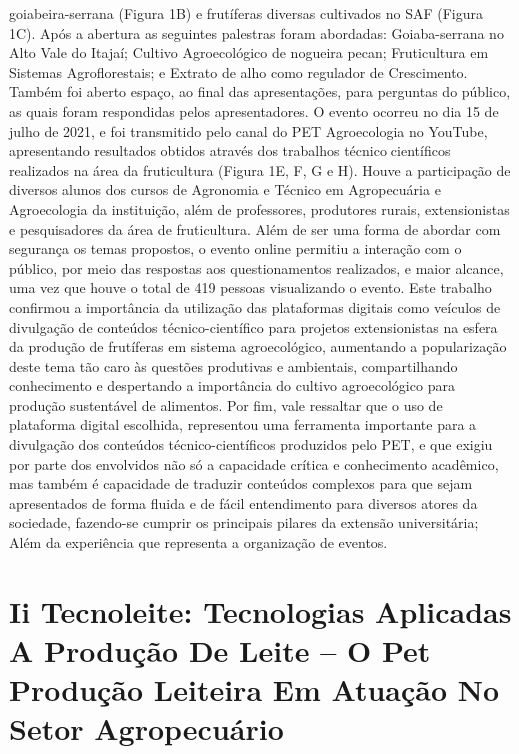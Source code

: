 goiabeira-serrana (Figura 1B) e frutíferas diversas cultivados no SAF (Figura 1C). Após a abertura 
as seguintes palestras foram abordadas: Goiaba-serrana no Alto Vale do Itajaí; Cultivo 
Agroecológico de nogueira pecan; Fruticultura em Sistemas Agroflorestais; e Extrato de alho 
como regulador de Crescimento. Também foi aberto espaço, ao final das apresentações, para 
perguntas do público, as quais foram respondidas pelos apresentadores.
O evento ocorreu no dia 15 de julho de 2021, e foi transmitido pelo canal do PET 
Agroecologia no YouTube, apresentando resultados obtidos através dos trabalhos técnicocientíficos realizados na área da fruticultura (Figura 1E, F, G e H). 
Houve a participação de diversos alunos dos cursos de Agronomia e Técnico em 
Agropecuária e Agroecologia da instituição, além de professores, produtores rurais, extensionistas 
e pesquisadores da área de fruticultura. Além de ser uma forma de abordar com segurança os temas 
propostos, o evento online permitiu a interação com o público, por meio das respostas aos 
questionamentos realizados, e maior alcance, uma vez que houve o total de 419 pessoas 
visualizando o evento.
Este trabalho confirmou a importância da utilização das plataformas digitais como veículos 
de divulgação de conteúdos técnico-científico para projetos extensionistas na esfera da produção 
de frutíferas em sistema agroecológico, aumentando a popularização deste tema tão caro às 
questões produtivas e ambientais, compartilhando conhecimento e despertando a importância do 
cultivo agroecológico para produção sustentável de alimentos.
Por fim, vale ressaltar que o uso de plataforma digital escolhida, representou uma 
ferramenta importante para a divulgação dos conteúdos técnico-científicos produzidos pelo PET, 
e que exigiu por parte dos envolvidos não só a capacidade crítica e conhecimento acadêmico, mas 
também é capacidade de traduzir conteúdos complexos para que sejam apresentados de forma 
fluida e de fácil entendimento para diversos atores da sociedade, fazendo-se cumprir os principais 
pilares da extensão universitária; Além da experiência que representa a organização de eventos.




\section*{Ii Tecnoleite: Tecnologias Aplicadas A Produção De Leite – O Pet Produção Leiteira Em Atuação No Setor Agropecuário}


